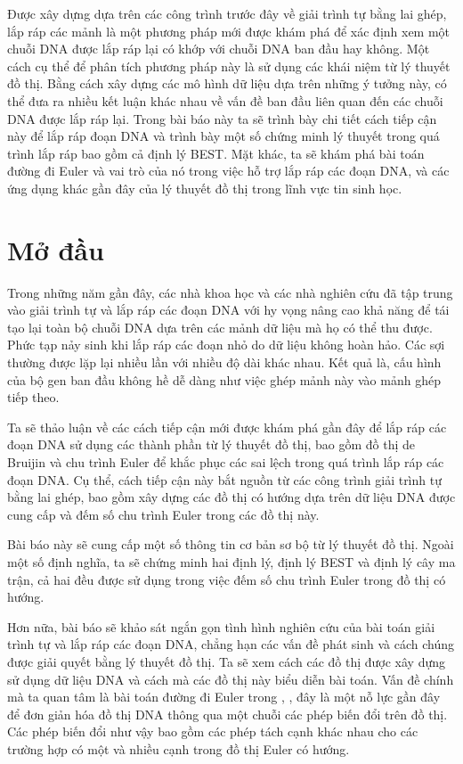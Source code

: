 \documentclass[14pt, a4paper]{article}
\numberwithin{equation}{section}
\numberwithin{figure}{section}
\numberwithin{dl}{section}
\numberwithin{md}{section}
\numberwithin{bd}{section}
\numberwithin{dn}{section}
\numberwithin{hq}{section}
\begin{document}
    Được xây dựng dựa trên các công trình trước đây về giải trình tự bằng lai ghép, lắp ráp các mảnh là một phương pháp mới được khám phá để xác định xem một chuỗi DNA được lắp ráp lại có khớp với chuỗi DNA ban đầu hay không.
    Một cách cụ thể để phân tích phương pháp này là sử dụng các khái niệm từ lý thuyết đồ thị.
    Bằng cách xây dựng các mô hình dữ liệu dựa trên những ý tưởng này, có thể đưa ra nhiều kết luận khác nhau về vấn đề ban đầu liên quan đến các chuỗi DNA được lắp ráp lại.
    Trong bài báo này ta sẽ trình bày chi tiết cách tiếp cận này để lắp ráp đoạn DNA và trình bày một số chứng minh lý thuyết trong quá trình lắp ráp bao gồm cả định lý BEST.
    Mặt khác, ta sẽ khám phá bài toán đường đi Euler và vai trò của nó trong việc hỗ trợ lắp ráp các đoạn DNA, và các ứng dụng khác gần đây của lý thuyết đồ thị trong lĩnh vực tin sinh học.

    \newpage
    \section{Mở đầu}
    
    Trong những năm gần đây, các nhà khoa học và các nhà nghiên cứu đã tập trung vào giải trình tự và lắp ráp các đoạn DNA với hy vọng nâng cao khả năng để tái tạo lại toàn bộ chuỗi DNA dựa trên các mảnh dữ liệu mà họ có thể thu được.
    Phức tạp nảy sinh khi lắp ráp các đoạn nhỏ do dữ liệu không hoàn hảo.
    Các sợi thường được lặp lại nhiều lần với nhiều độ dài khác nhau.
    Kết quả là, cấu hình của bộ gen ban đầu không hề dễ dàng như việc ghép mảnh này vào mảnh ghép tiếp theo.

    Ta sẽ thảo luận về các cách tiếp cận mới được khám phá gần đây để lắp ráp các đoạn DNA sử dụng các thành phần từ lý thuyết đồ thị,
    bao gồm đồ thị de Bruijin và chu trình Euler để khắc phục các sai lệch trong quá trình lắp ráp các đoạn DNA.
    Cụ thể, cách tiếp cận này bắt nguồn từ các công trình giải trình tự bằng lai ghép, bao gồm xây dựng các đồ thị có hướng dựa trên dữ liệu DNA được cung cấp và đếm số chu trình Euler trong các đồ thị này.

    Bài báo này sẽ cung cấp một số thông tin cơ bản sơ bộ từ lý thuyết đồ thị.
    Ngoài một số định nghĩa, ta sẽ chứng minh hai định lý, định lý BEST và định lý cây ma trận, cả hai đều được sử dụng trong việc đếm số chu trình Euler trong đồ thị có hướng.

    Hơn nữa, bài báo sẽ khảo sát ngắn gọn tình hình nghiên cứu của bài toán giải trình tự và lắp ráp các đoạn DNA,
    chẳng hạn các vấn đề phát sinh và cách chúng được giải quyết bằng lý thuyết đồ thị.
    Ta sẽ xem cách các đồ thị được xây dựng sử dụng dữ liệu DNA và cách mà các đồ thị này biểu diễn bài toán.
    Vấn đề chính mà ta quan tâm là bài toán đường đi Euler trong \cite{pevzner2001eulerian}, \cite{pevzner2001new}, đây là một nỗ lực gần đây để đơn giản hóa đồ thị DNA thông qua một chuỗi các phép biến đổi trên đồ thị.
    Các phép biến đổi như vậy bao gồm các phép tách cạnh khác nhau cho các trường hợp có một và nhiều cạnh trong đồ thị Euler có hướng.
\end{document}
